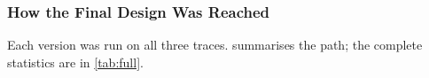 \documentclass[12pt, a4paper]{article}
\begin{document}

\subsubsection{How the Final Design Was Reached}\label{sec:spp-evolution}
Each version was run on all three traces.
 summarises the path; the complete statistics are in
\cref{tab:full}.
\end{document}
